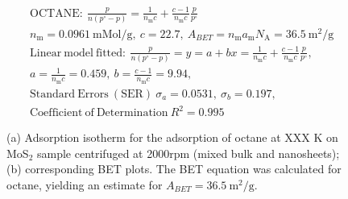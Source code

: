 

\begin{align*}
&\mathrm{OCTANE:}\ \frac{p}{n(p^\circ-p)}=\frac{1}{n_\mathrm{m}c}+\frac{c-1}{n_\mathrm{m}c}\frac{p}{p^\circ}\\
&{n_\mathrm{m}}=0.0961\ \mathrm{mMol/g},\ c=22.7,\ A_{BET}={n_\mathrm{m}}{a_\mathrm{m}}{N_\mathrm{A}}=36.5\ \mathrm{m}^2\mathrm{/g}\\
&\mathrm{Linear\ model\ fitted:}\ \frac{p}{n(p^\circ-p)}=y=a+bx=\frac{1}{n_\mathrm{m}c}+\frac{c-1}{n_\mathrm{m}c}\frac{p}{p^\circ},\\
&a=\frac{1}{n_\mathrm{m}c}=0.459,\ b=\frac{c-1}{n_\mathrm{m}c}=9.94,\\
&\mathrm{Standard\ Errors\ (SER)}\ \sigma_a=0.0531,\ \sigma_b=0.197,\\
&\mathrm{Coefficient\ of\ Determination}\ R^2 = 0.995
\end{align*}


\begin{figure}[htb]
\hfill
{}
\caption{(a) Adsorption isotherm for the adsorption of octane at XXX K on MoS$_2$ 
sample centrifuged at 2000rpm (mixed bulk and nanosheets);
(b) corresponding BET plots. The BET equation was calculated for octane, yielding an estimate for $A_{BET}=36.5\ \mathrm{m}^2\mathrm{/g}$.}

\label{fig:sa-Nanosheets-Prep-I-750rpm-20mg-01-3mm-30C-S2-SA-10ml}
\end{figure}


